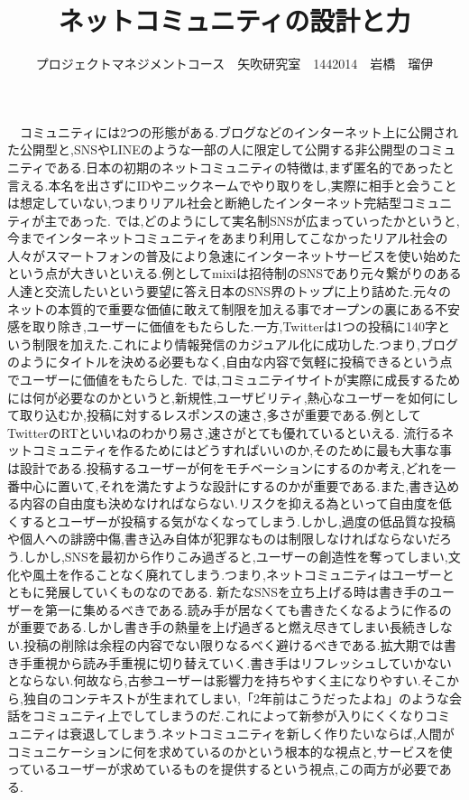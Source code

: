 \documentclass[uplatex,twocolumn,dvipdfmx]{jsarticle}
\title{\vspace{-5mm}\fontsize{14pt}{0pt}\selectfont ネットコミュニティの設計と力}
\author{\normalsize プロジェクトマネジメントコース　矢吹研究室　1442014　岩橋　瑠伊}
\date{}
\begin{document}
\fontsize{10.5pt}{\baselineskip}\selectfont
\maketitle





　コミュニティには2つの形態がある.ブログなどのインターネット上に公開された公開型と,SNSやLINEのような一部の人に限定して公開する非公開型のコミュニティである.日本の初期のネットコミュニティの特徴は,まず匿名的であったと言える.本名を出さずにIDやニックネームでやり取りをし,実際に相手と会うことは想定していない,つまりリアル社会と断絶したインターネット完結型コミュニティが主であった.
では,どのようにして実名制SNSが広まっていったかというと,今までインターネットコミュニティをあまり利用してこなかったリアル社会の人々がスマートフォンの普及により急速にインターネットサービスを使い始めたという点が大きいといえる.例としてmixiは招待制のSNSであり元々繋がりのある人達と交流したいという要望に答え日本のSNS界のトップに上り詰めた.元々のネットの本質的で重要な価値に敢えて制限を加える事でオープンの裏にある不安感を取り除き,ユーザーに価値をもたらした.一方,Twitterは1つの投稿に140字という制限を加えた.これにより情報発信のカジュアル化に成功した.つまり,ブログのようにタイトルを決める必要もなく,自由な内容で気軽に投稿できるという点でユーザーに価値をもたらした.
では,コミュニテイサイトが実際に成長するためには何が必要なのかというと,新規性,ユーザビリティ,熱心なユーザーを如何にして取り込むか,投稿に対するレスポンスの速さ,多さが重要である.例としてTwitterのRTといいねのわかり易さ,速さがとても優れているといえる.
流行るネットコミュニティを作るためにはどうすればいいのか,そのために最も大事な事は設計である.投稿するユーザーが何をモチベーションにするのか考え,どれを一番中心に置いて,それを満たすような設計にするのかが重要である.また,書き込める内容の自由度も決めなければならない.リスクを抑える為といって自由度を低くするとユーザーが投稿する気がなくなってしまう.しかし,過度の低品質な投稿や個人への誹謗中傷,書き込み自体が犯罪なものは制限しなければならないだろう.しかし,SNSを最初から作りこみ過ぎると,ユーザーの創造性を奪ってしまい,文化や風土を作ることなく廃れてしまう.つまり,ネットコミュニティはユーザーとともに発展していくものなのである.
新たなSNSを立ち上げる時は書き手のユーザーを第一に集めるべきである.読み手が居なくても書きたくなるように作るのが重要である.しかし書き手の熱量を上げ過ぎると燃え尽きてしまい長続きしない.投稿の削除は余程の内容でない限りなるべく避けるべきである.拡大期では書き手重視から読み手重視に切り替えていく.書き手はリフレッシュしていかないとならない.何故なら,古参ユーザーは影響力を持ちやすく主になりやすい.そこから,独自のコンテキストが生まれてしまい,「2年前はこうだったよね」のような会話をコミュニティ上でしてしまうのだ.これによって新参が入りにくくなりコミュニティは衰退してしまう.ネットコミュニティを新しく作りたいならば,人間がコミュニケーションに何を求めているのかという根本的な視点と,サービスを使っているユーザーが求めているものを提供するという視点,この両方が必要である.
\end{document}
